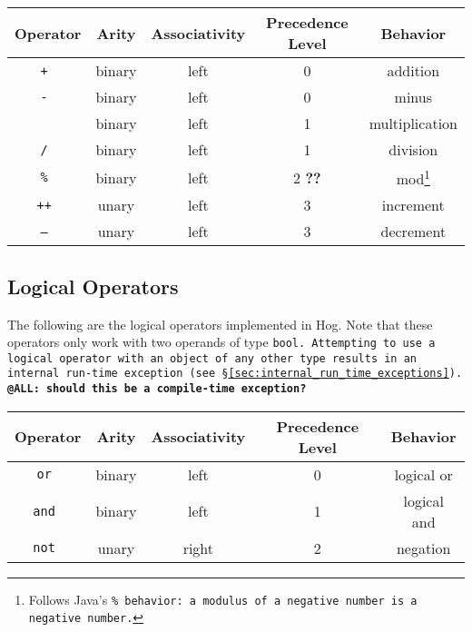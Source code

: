 \documentclass{book}
\begin{document}
\begin{center}
\begin{tabular}{|c|c|c|c|c|}

\hline \textbf{Operator} & \textbf{Arity} & \textbf{Associativity} &
\textbf{Precedence Level} & \textbf{Behavior} \\ \hline
\tt + \rm & binary & left & 0 & addition \\ \hline
\tt - \rm & binary & left & 0 & minus \\ \hline
\tt * \rm & binary & left & 1 & multiplication \\ \hline
\tt / \rm & binary & left & 1 & division \\ \hline
\tt \% \rm & binary & left & 2 \textbf{??} & mod\footnote{Follows Java's 
\tt \% \rm behavior: a modulus of a negative number is a negative number.} \\ 
\hline
\tt ++ \rm & unary & left & 3 & increment \\ \hline
\tt -- \rm & unary & left & 3 & decrement \\ \hline
\end{tabular}
\end{center}


\subsection{Logical Operators} %
\label{sub:logical_operators}

The following are the logical operators implemented in Hog. Note that these
operators only work with two operands of type \tt bool\rm. Attempting to use a
logical operator with an object of any other type results in an internal run-time
exception (see \S \ref{sec:internal_run_time_exceptions}). \textbf{@ALL: should
this be a compile-time exception?}

\begin{center}
\begin{tabular}{|c|c|c|c|c|}

\hline \textbf{Operator} & \textbf{Arity} & \textbf{Associativity} &
\textbf{Precedence Level} & \textbf{Behavior} \\ \hline
\tt or \rm & binary & left & 0 & logical or \\ \hline
\tt and \rm & binary & left & 1 & logical and \\ \hline
\tt not \rm & unary & right & 2 & negation \\ \hline
\end{tabular}
\end{center}
\end{document}

